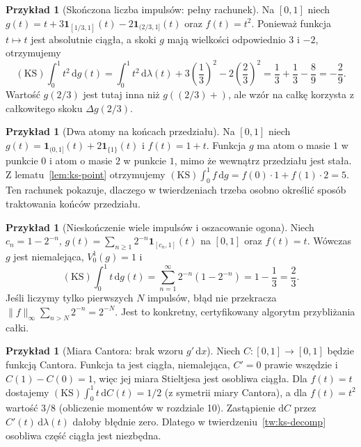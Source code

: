 \documentclass[11pt,a4paper]{article}
\numberwithin{equation}{section}
\theoremstyle{plain}
\theoremstyle{definition}
\newtheorem{przyklad}[twierdzenie]{Przykład}
\theoremstyle{remark}
\newcommand{\ind}[1]{\mathbf 1_{#1}}
\newcommand{\KS}{\mathrm{KS}}
\begin{document}
\begin{przyklad}[Skończona liczba impulsów: pełny rachunek]
Na $[0,1]$ niech $g(t)=t+3\ind{[1/3,1]}(t)-2\ind{(2/3,1]}(t)$ oraz $f(t)=t^2$. Ponieważ funkcja $t\mapsto t$ jest absolutnie ciągła, a skoki $g$ mają wielkości odpowiednio $3$ i $-2$, otrzymujemy
\[
 (\KS)\int_0^1 t^2\,\mathrm dg(t)
 =\int_0^1 t^2\,\mathrm d\lambda(t)
 +3\left(\frac13\right)^2-2\left(\frac23\right)^2
 =\frac13+\frac13-\frac89=-\frac29.
\]
Wartość $g(2/3)$ jest tutaj inna niż $g((2/3)+)$, ale wzór na całkę korzysta z całkowitego skoku $\Delta g(2/3)$.
\end{przyklad}

\begin{przyklad}[Dwa atomy na końcach przedziału]
Na $[0,1]$ niech $g(t)=\ind{(0,1]}(t)+2\ind{\{1\}}(t)$ i $f(t)=1+t$. Funkcja $g$ ma atom o masie $1$ w punkcie $0$ i atom o masie $2$ w punkcie $1$, mimo że wewnątrz przedziału jest stała. Z lematu~\ref{lem:ks-point} otrzymujemy
$(\KS)\int_0^1 f\,\mathrm dg=f(0)\cdot1+f(1)\cdot2=5$.
Ten rachunek pokazuje, dlaczego w twierdzeniach trzeba osobno określić sposób traktowania końców przedziału.
\end{przyklad}

\begin{przyklad}[Nieskończenie wiele impulsów i oszacowanie ogona]
Niech $c_n=1-2^{-n}$, $g(t)=\sum_{n\ge1}2^{-n}\ind{[c_n,1]}(t)$ na $[0,1]$ oraz $f(t)=t$. Wówczas $g$ jest niemalejąca, $V_0^1(g)=1$ i
\[
 (\KS)\int_0^1 t\,\mathrm dg(t)
 =\sum_{n=1}^\infty2^{-n}(1-2^{-n})
 =1-\frac13=\frac23.
\]
Jeśli liczymy tylko pierwszych $N$ impulsów, błąd nie przekracza $\|f\|_\infty\sum_{n>N}2^{-n}=2^{-N}$. Jest to konkretny, certyfikowany algorytm przybliżania całki.
\end{przyklad}

\begin{przyklad}[Miara Cantora: brak wzoru $g'\,\mathrm dx$]
Niech $C:[0,1]\to[0,1]$ będzie funkcją Cantora. Funkcja ta jest ciągła, niemalejąca, $C'=0$ prawie wszędzie i $C(1)-C(0)=1$, więc jej miara Stieltjesa jest osobliwa ciągła. Dla $f(t)=t$ dostajemy $(\KS)\int_0^1 t\,\mathrm dC(t)=1/2$ (z symetrii miary Cantora), a dla $f(t)=t^2$ wartość $3/8$ (obliczenie momentów w rozdziale 10). Zastąpienie $\mathrm dC$ przez $C'(t)\,\mathrm d\lambda(t)$ dałoby błędnie zero. Dlatego w twierdzeniu~\ref{tw:ks-decomp} osobliwa część ciągła jest niezbędna.
\end{przyklad}
\end{document}
